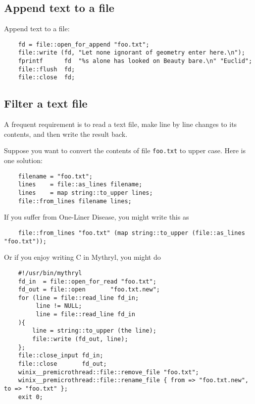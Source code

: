 \cutend*

\subsection{Append text to a file}

Append text to a file:
\begin{verbatim}
    fd = file::open_for_append "foo.txt";
    file::write (fd, "Let none ignorant of geometry enter here.\n"); 
    fprintf      fd  "%s alone has looked on Beauty bare.\n" "Euclid";
    file::flush  fd;
    file::close  fd;
\end{verbatim}

\cutend*

\subsection{Filter a text file}

A frequent requirement is to read a text file, make line by line 
changes to its contents, and then write the result back.

Suppose you want to convert the contents of file {\tt foo.txt} 
to upper case.  Here is one solution:

\begin{verbatim}
    filename = "foo.txt";
    lines    = file::as_lines filename;
    lines    = map string::to_upper lines;
    file::from_lines filename lines; 
\end{verbatim}

If you suffer from One-Liner Disease, you might write this as

\begin{verbatim}
    file::from_lines "foo.txt" (map string::to_upper (file::as_lines "foo.txt"));
\end{verbatim}

Or if you enjoy writing C in Mythryl, you might do

\begin{verbatim}
    #!/usr/bin/mythryl
    fd_in  = file::open_for_read "foo.txt";
    fd_out = file::open       "foo.txt.new";
    for (line = file::read_line fd_in;
         line != NULL;
         line = file::read_line fd_in
    ){
        line = string::to_upper (the line);
        file::write (fd_out, line);
    };
    file::close_input fd_in;
    file::close       fd_out;
    winix__premicrothread::file::remove_file "foo.txt";
    winix__premicrothread::file::rename_file { from => "foo.txt.new", to => "foo.txt" };
    exit 0;
\end{verbatim}

